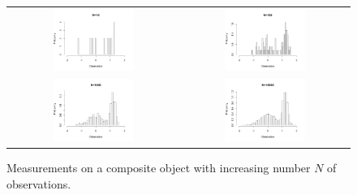 \begin{figure}[ht]
\centering
\begin{tabular}{cc}
\includegraphics[width=0.5\textwidth,trim={0 20 50 0},clip]
{img/StateComposition_10.png}&
\includegraphics[width=0.5\textwidth,trim={0 20 50 0},clip]{img/StateComposition_100.png}\\
\includegraphics[width=0.5\textwidth,trim={0 20 50 0},clip]{img/StateComposition_1000.png}&
\includegraphics[width=0.5\textwidth,trim={0 20 50 0},clip]{img/StateComposition_10000.png}
\end{tabular}
\caption{Measurements on a composite object with increasing number $N$ of observations.}
\label{figQuoteChangeCluster}
\end{figure}
